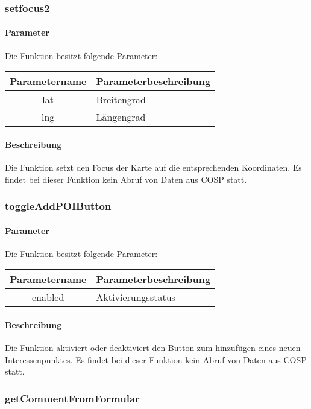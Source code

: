 \subsubsection{setfocus2}
\paragraph{Parameter} Die Funktion besitzt folgende Parameter:
\begin{table}[H]
	\begin{tabular}{|c|p{11cm}|}
		\hline
		\textbf{Parametername} & \textbf{Parameterbeschreibung} \\ \hline
		lat & Breitengrad \\ \hline
		lng & Längengrad \\ \hline
	\end{tabular}
\end{table}
\paragraph{Beschreibung} Die Funktion setzt den Focus der Karte auf die entsprechenden Koordinaten. Es findet bei dieser Funktion kein Abruf von Daten aus {\glqq COSP\grqq} statt.
\subsubsection{toggleAddPOIButton}
\paragraph{Parameter} Die Funktion besitzt folgende Parameter:
\begin{table}[H]
	\begin{tabular}{|c|p{11cm}|}
		\hline
		\textbf{Parametername} & \textbf{Parameterbeschreibung} \\ \hline
		enabled & Aktivierungsstatus \\ \hline
	\end{tabular}
\end{table}
\paragraph{Beschreibung} Die Funktion aktiviert oder deaktiviert den Button zum hinzufügen eines neuen Interessenpunktes. Es findet bei dieser Funktion kein Abruf von Daten aus {\glqq COSP\grqq} statt.
\subsubsection{getCommentFromFormular}
